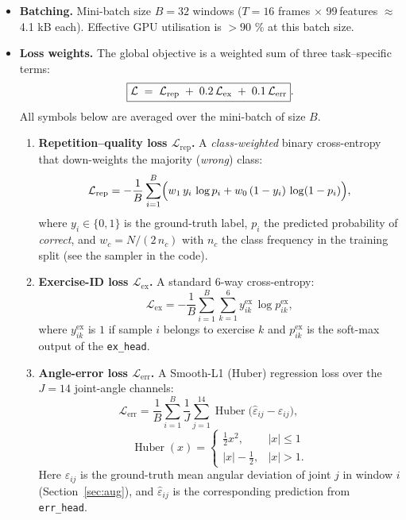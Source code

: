 \documentclass{article}
\begin{document}
\begin{enumerate}[label=\textbf{\Alph*.}, leftmargin=2em, itemsep=6pt]
\begin{itemize}[leftmargin=1.5em, itemsep=4pt]
  \item \textbf{Batching.}  
        Mini-batch size $B = 32$ windows  
        ($T\!=\!16$ frames $\times$ 99 features $\approx$ 4.1 kB each).  
        Effective GPU utilisation is ${>}90$ \% at this batch size.

  \item \textbf{Loss weights.}  The global objective is a
weighted sum of three task–specific terms:
\[
  \boxed{%
    \mathcal{L}
    \;=\;
    \mathcal{L}_{\text{rep}}
    \;+\;
    0.2\,\mathcal{L}_{\text{ex}}
    \;+\;
    0.1\,\mathcal{L}_{\text{err}}
  } .
\]
All symbols below are averaged over the mini-batch of size $B$.

\begin{enumerate}[label=\alph*)]
  \item \textbf{Repetition–quality loss
        $\mathcal{L}_{\text{rep}}$.}  
        A \emph{class-weighted} binary cross-entropy that down-weights
        the majority (\textit{wrong}) class:  
        \[
          \mathcal{L}_{\text{rep}}
          =
          -\frac{1}{B}\sum_{i=1}^{B}
          \Bigl(
            w_{1}\,y_{i}\,\log p_{i}
            +
            w_{0}\,(1-y_{i})\,\log(1-p_{i})
          \Bigr),
        \]
        where $y_{i}\!\in\!\{0,1\}$ is the ground-truth label,
        $p_{i}$ the predicted probability of
        \textit{correct}, and
        $w_{c}=N/(2\,n_{c})$ with $n_{c}$ the class frequency in the
        training split (see the sampler in the code).

  \item \textbf{Exercise-ID loss
        $\mathcal{L}_{\text{ex}}$.}  
        A standard 6-way cross-entropy:
        \[
          \mathcal{L}_{\text{ex}}
          =
          -\frac{1}{B}\sum_{i=1}^{B}
          \sum_{k=1}^{6}
          y^{\text{ex}}_{ik}\,
          \log p^{\text{ex}}_{ik},
        \]
        where $y^{\text{ex}}_{ik}$ is $1$ if sample $i$ belongs to
        exercise $k$ and $p^{\text{ex}}_{ik}$ is the soft-max output
        of the \texttt{ex\_head}.

  \item \textbf{Angle-error loss
        $\mathcal{L}_{\text{err}}$.}  
        A Smooth-L1 (Huber) regression loss over the
        $J\!=\!14$ joint-angle channels:
        \[
          \mathcal{L}_{\text{err}}
          =
          \frac{1}{B}\sum_{i=1}^{B}
          \frac{1}{J}\sum_{j=1}^{14}
          \operatorname{Huber}\!
          \bigl(
            \hat{\varepsilon}_{ij} - \varepsilon_{ij}
          \bigr),
          \qquad
        \]
         \[
          \operatorname{Huber}(x)=
          \begin{cases}
            \tfrac{1}{2}x^{2}, & |x|\le 1\\[3pt]
            |x|-\tfrac{1}{2},  & |x|>1 .
          \end{cases}
        \]
        Here $\varepsilon_{ij}$ is the ground-truth mean angular
        deviation of joint $j$ in window $i$
        (Section~\ref{sec:aug}), and $\hat{\varepsilon}_{ij}$ is the
        corresponding prediction from \texttt{err\_head}.
\end{enumerate}


\end{itemize}
\end{enumerate}
\end{document}
